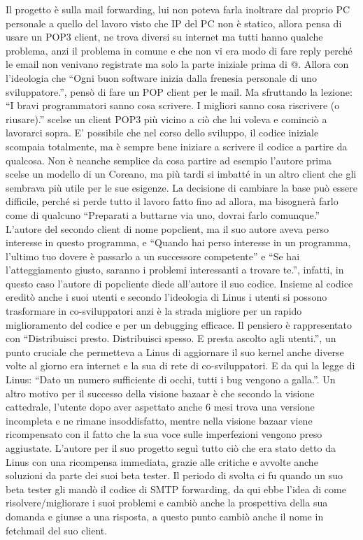 \documentclass[a4page, 11pt, twocolumn]{article}
\begin{document}
Il progetto è sulla mail forwarding, lui non poteva farla inoltrare dal
proprio PC personale a quello del lavoro visto che IP del PC non è
statico, allora pensa di usare un POP3 client, ne trova diversi su
internet ma tutti hanno qualche problema, anzi il problema in comune e
che non vi era modo di fare reply perché le email non venivano
registrate ma solo la parte iniziale prima di @. Allora con l'ideologia
che ``Ogni buon software inizia dalla frenesia personale di uno
sviluppatore.'', pensò di fare un POP client per le mail. Ma sfruttando
la lezione: ``I bravi programmatori sanno cosa scrivere. I migliori
sanno cosa riscrivere (o riusare).'' scelse un client POP3 più vicino a
ciò che lui voleva e cominciò a lavorarci sopra. E' possibile che nel
corso dello sviluppo, il codice iniziale scompaia totalmente, ma è
sempre bene iniziare a scrivere il codice a partire da qualcosa. Non è
neanche semplice da cosa partire ad esempio l'autore prima scelse un
modello di un Coreano, ma più tardi si imbatté in un altro client che
gli sembrava più utile per le sue esigenze. La decisione di cambiare la
base può essere difficile, perché si perde tutto il lavoro fatto fino ad
allora, ma bisognerà farlo come di qualcuno ``Preparati a buttarne via
uno, dovrai farlo comunque.'' L'autore del secondo client di nome
popclient, ma il suo autore aveva perso interesse in questo programma, e
``Quando hai perso interesse in un programma, l'ultimo tuo dovere è
passarlo a un successore competente'' e ``Se hai l'atteggiamento giusto,
saranno i problemi interessanti a trovare te.'', infatti, in questo caso
l'autore di popcliente diede all'autore il suo codice. Insieme al codice
ereditò anche i suoi utenti e secondo l'ideologia di Linus i utenti si
possono trasformare in co-sviluppatori anzi è la strada migliore per un
rapido miglioramento del codice e per un debugging efficace. Il pensiero
è rappresentato con ``Distribuisci presto. Distribuisci spesso. E presta
ascolto agli utenti.'', un punto cruciale che permetteva a Linus di
aggiornare il suo kernel anche diverse volte al giorno era internet e la
sua di rete di co-sviluppatori. E da qui la legge di Linus: ``Dato un
numero sufficiente di occhi, tutti i bug vengono a galla.''. Un altro
motivo per il successo della visione bazaar è che secondo la visione
cattedrale, l'utente dopo aver aspettato anche 6 mesi trova una versione
incompleta e ne rimane insoddisfatto, mentre nella visione bazaar viene
ricompensato con il fatto che la sua voce sulle imperfezioni vengono
preso aggiustate. L'autore per il suo progetto seguì tutto ciò che era
stato detto da Linus con una ricompensa immediata, grazie alle critiche
e avvolte anche soluzioni da parte dei suoi beta tester. Il periodo di
svolta ci fu quando un suo beta tester gli mandò il codice di SMTP
forwarding, da qui ebbe l'idea di come risolvere/migliorare i suoi
problemi e cambiò anche la prospettiva della sua domanda e giunse a una
risposta, a questo punto cambiò anche il nome in fetchmail del suo
client.
\end{document}
